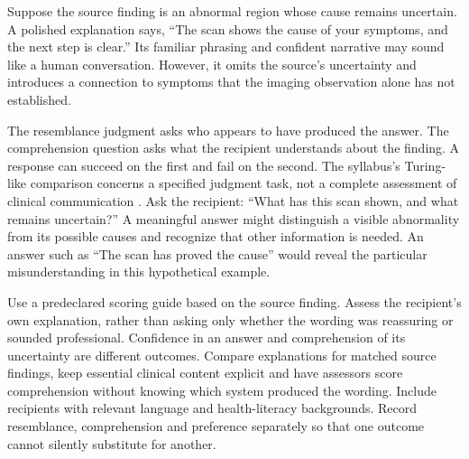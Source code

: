 \biomedicalanswer
{}
Suppose the source finding is an abnormal region whose cause remains uncertain. A polished explanation says, ``The scan shows the cause of your symptoms, and the next step is clear.'' Its familiar phrasing and confident narrative may sound like a human conversation. However, it omits the source's uncertainty and introduces a connection to symptoms that the imaging observation alone has not established.

The resemblance judgment asks who appears to have produced the answer. The comprehension question asks what the recipient understands about the finding. A response can succeed on the first and fail on the second. The syllabus's Turing-like comparison concerns a specified judgment task, not a complete assessment of clinical communication \citep{zhang2026turing}.
Ask the recipient: ``What has this scan shown, and what remains uncertain?'' A meaningful answer might distinguish a visible abnormality from its possible causes and recognize that other information is needed. An answer such as ``The scan has proved the cause'' would reveal the particular misunderstanding in this hypothetical example.

Use a predeclared scoring guide based on the source finding. Assess the recipient's own explanation, rather than asking only whether the wording was reassuring or sounded professional. Confidence in an answer and comprehension of its uncertainty are different outcomes.
Compare explanations for matched source findings, keep essential clinical content explicit and have assessors score comprehension without knowing which system produced the wording. Include recipients with relevant language and health-literacy backgrounds. Record resemblance, comprehension and preference separately so that one outcome cannot silently substitute for another.

